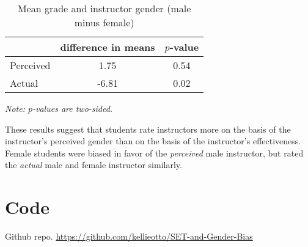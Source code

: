 \documentclass[12pt]{article}
\newcommand{\todo}[1]{{\color{red}{TO DO: \sc #1}}}
\begin{document}
\begin{table}[htbp]
  \centering
  \footnotesize 
  \caption{Mean grade and instructor gender (male minus female)}
    \begin{tabular}{lcc}
    \toprule 
                     & difference in means   & $p$-value    \\
   \midrule
    Perceived &         1.75       & 0.54      \\
    Actual  &            -6.81       & 0.02      \\
    \bottomrule
    \end{tabular}%
 \label{tab:macnell4}%
 
\textit{Note: $p$-values are two-sided.}
\end{table}%
\normalsize

These results suggest that students rate instructors more on the basis of the instructor's perceived
gender than on the basis of the instructor's effectiveness. 
Female students were biased in favor of the \textit{perceived} male instructor, 
but rated the \textit{actual} male and female instructor similarly. 



\section{Code}
Github repo. \url{https://github.com/kellieotto/SET-and-Gender-Bias}
\todo{want to put this in the statlab repo?}



\end{document}
